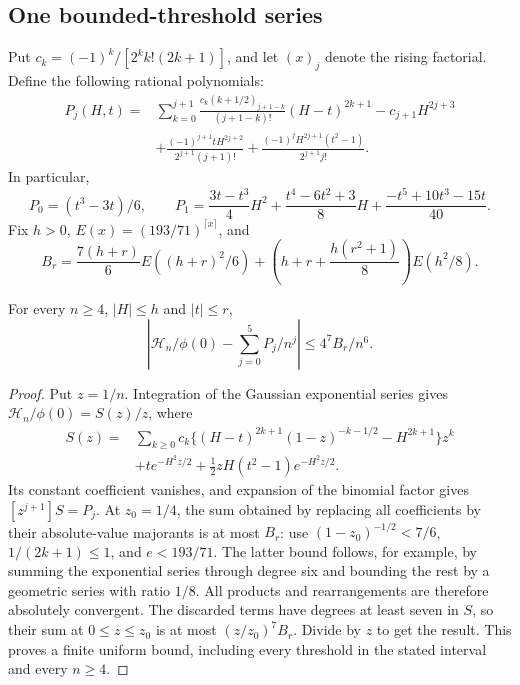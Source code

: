 \subsection{One bounded-threshold series}\label{ms:legacy-support:series}
Put $c_k=(-1)^k/[2^kk!(2k+1)]$, and let $(x)_j$ denote the rising
factorial. Define the following rational polynomials:
\begin{align*}
 P_j(H,t)={}&\sum_{k=0}^{j+1}
 \frac{c_k(k+1/2)_{j+1-k}}{(j+1-k)!}(H-t)^{2k+1}
       -c_{j+1}H^{2j+3}\\
 &+\frac{(-1)^{j+1}tH^{2j+2}}{2^{j+1}(j+1)!}
       +\frac{(-1)^jH^{2j+1}(t^2-1)}{2^{j+1}j!}.
\end{align*}
In particular,
\[
 P_0=(t^3-3t)/6,\qquad
 P_1=\frac{3t-t^3}{4}H^2+\frac{t^4-6t^2+3}{8}H
                  +\frac{-t^5+10t^3-15t}{40}.
\]
Fix $h>0$, $E(x)=(193/71)^{\lceil x\rceil}$, and
\[
 B_r=\frac{7(h+r)}6E((h+r)^2/6)
       +\left(h+r+\frac{h(r^2+1)}8\right)E(h^2/8).
\]
\begin{lemma}\label{ms:legacy-support:finite-series}
For every $n\ge4$, $|H|\le h$ and $|t|\le r$,
\[
 \left|\mathcal H_n/\phi(0)-\sum_{j=0}^5P_j/n^j\right|
       \le4^7B_r/n^6.
\]
\end{lemma}
\begin{proof}
Put $z=1/n$. Integration of the Gaussian exponential series gives
$\mathcal H_n/\phi(0)=S(z)/z$, where
\begin{align*}
 S(z)={}&\sum_{k\ge0}c_k\{(H-t)^{2k+1}(1-z)^{-k-1/2}
                                  -H^{2k+1}\}z^k\\
 &+te^{-H^2z/2}+\tfrac12zH(t^2-1)e^{-H^2z/2}.
\end{align*}
Its constant coefficient vanishes, and expansion of the binomial factor
gives $[z^{j+1}]S=P_j$. At $z_0=1/4$, the sum obtained by replacing
all coefficients by their absolute-value majorants is at most $B_r$:
use $(1-z_0)^{-1/2}<7/6$, $1/(2k+1)\le1$, and $e<193/71$.
The latter bound follows, for example, by summing the exponential series
through degree six and bounding the rest by a geometric series with
ratio $1/8$. All products and rearrangements are therefore absolutely
convergent. The discarded terms have degrees at least seven in $S$,
so their sum at $0\le z\le z_0$ is at most $(z/z_0)^7B_r$.
Divide by $z$ to get the result. This proves a finite uniform bound,
including every threshold in the stated interval and every $n\ge4$.
\end{proof}

